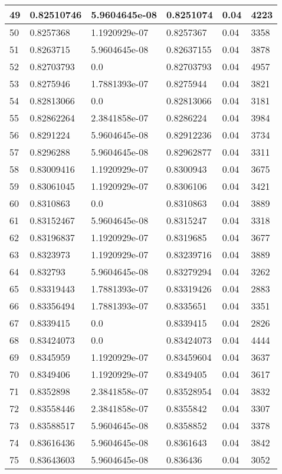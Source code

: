 \begin{longtable}{|l|l|l|l|l|l|}
49 & 0.82510746 & 5.9604645e-08 & 0.8251074 & 0.04 & 4223 \\ \hline 
50 & 0.8257368 & 1.1920929e-07 & 0.8257367 & 0.04 & 3358 \\ \hline 
51 & 0.8263715 & 5.9604645e-08 & 0.82637155 & 0.04 & 3878 \\ \hline 
52 & 0.82703793 & 0.0 & 0.82703793 & 0.04 & 4957 \\ \hline 
53 & 0.8275946 & 1.7881393e-07 & 0.8275944 & 0.04 & 3821 \\ \hline 
54 & 0.82813066 & 0.0 & 0.82813066 & 0.04 & 3181 \\ \hline 
55 & 0.82862264 & 2.3841858e-07 & 0.8286224 & 0.04 & 3984 \\ \hline 
56 & 0.8291224 & 5.9604645e-08 & 0.82912236 & 0.04 & 3734 \\ \hline 
57 & 0.8296288 & 5.9604645e-08 & 0.82962877 & 0.04 & 3311 \\ \hline 
58 & 0.83009416 & 1.1920929e-07 & 0.8300943 & 0.04 & 3675 \\ \hline 
59 & 0.83061045 & 1.1920929e-07 & 0.8306106 & 0.04 & 3421 \\ \hline 
60 & 0.8310863 & 0.0 & 0.8310863 & 0.04 & 3889 \\ \hline 
61 & 0.83152467 & 5.9604645e-08 & 0.8315247 & 0.04 & 3318 \\ \hline 
62 & 0.83196837 & 1.1920929e-07 & 0.8319685 & 0.04 & 3677 \\ \hline 
63 & 0.8323973 & 1.1920929e-07 & 0.83239716 & 0.04 & 3889 \\ \hline 
64 & 0.832793 & 5.9604645e-08 & 0.83279294 & 0.04 & 3262 \\ \hline 
65 & 0.83319443 & 1.7881393e-07 & 0.83319426 & 0.04 & 2883 \\ \hline 
66 & 0.83356494 & 1.7881393e-07 & 0.8335651 & 0.04 & 3351 \\ \hline 
67 & 0.8339415 & 0.0 & 0.8339415 & 0.04 & 2826 \\ \hline 
68 & 0.83424073 & 0.0 & 0.83424073 & 0.04 & 4444 \\ \hline 
69 & 0.8345959 & 1.1920929e-07 & 0.83459604 & 0.04 & 3637 \\ \hline 
70 & 0.8349406 & 1.1920929e-07 & 0.8349405 & 0.04 & 3617 \\ \hline 
71 & 0.8352898 & 2.3841858e-07 & 0.83528954 & 0.04 & 3832 \\ \hline 
72 & 0.83558446 & 2.3841858e-07 & 0.8355842 & 0.04 & 3307 \\ \hline 
73 & 0.83588517 & 5.9604645e-08 & 0.8358852 & 0.04 & 3378 \\ \hline 
74 & 0.83616436 & 5.9604645e-08 & 0.8361643 & 0.04 & 3842 \\ \hline 
75 & 0.83643603 & 5.9604645e-08 & 0.836436 & 0.04 & 3052 \\ \hline 
\end{longtable}